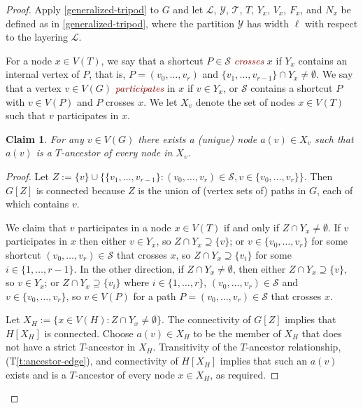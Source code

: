 \documentclass{patmorin}
\theoremstyle{plain}
\newtheorem{clm}{Claim}
\theoremstyle{definition}
\newcommand{\defin}[1]{\textcolor{Maroon}{\emph{#1}}}
\newcommand{\tref}[1]{(T\ref{t:#1})}
\renewcommand{\SS}{\mathcal{S}}
\begin{document}
\begin{proof}
Apply \cref{generalized-tripod} to $G$ and let $\mathcal{L}$, $\mathcal{Y}$, $\mathcal{T}$, $T$, $Y_x$, $V_x$, $F_x$, and $N_x$ be defined as in \cref{generalized-tripod}, where the partition $\mathcal{Y}$ has width $\ell$ with respect to the layering $\mathcal{L}$.

For a node $x\in V(T)$, we say that a shortcut $P\in\SS$ \defin{crosses} $x$ if $Y_x$ contains an internal vertex of $P$, that is, $P=(v_0,\ldots,v_r)$ and $\{v_1,\ldots,v_{r-1}\}\cap Y_x\neq\emptyset$.  We say that a vertex $v\in V(G)$ \defin{participates} in $x$ if $v\in Y_x$, or $\SS$ contains a shortcut $P$ with $v\in V(P)$ and $P$ crosses $x$. We let $X_v$ denote the set of nodes $x\in V(T)$ such that $v$ participates in $x$.

\begin{clm}\label{x-v-ancestor}
  For any $v\in V(G)$ there exists a (unique) node $a(v)\in X_v$ such that
  $a(v)$ is a $T$-ancestor of every node in $X_v$.
\end{clm}

\begin{proof}
  Let $Z := \{v\} \cup \{\{v_1,\ldots,v_{r-1}\}:(v_0,\ldots,v_r)\in\SS, v\in \{v_0,\ldots,v_r\}\}$. Then $G[Z]$ is connected because $Z$ is the union of (vertex sets of) paths in $G$, each of which contains $v$.

  We claim that $v$ participates in a node $x\in V(T)$ if and only if $Z\cap Y_x\neq\emptyset$.  If $v$ participates in $x$ then either $v\in Y_x$, so $Z\cap Y_x\supseteq\{v\}$; or $v\in \{v_0,\ldots,v_r\}$ for some shortcut $(v_0,\ldots,v_r)\in\SS$ that crosses $x$, so $Z\cap Y_x\supseteq \{v_i\}$ for some $i\in\{1,\ldots,r-1\}$.  In the other direction, if $Z\cap Y_x\neq\emptyset$, then either $Z\cap Y_x\supseteq \{v\}$, so $v\in Y_x$; or $Z\cap Y_x\supseteq \{v_i\}$ where $i\in\{1,\ldots,r\}$, $(v_0,\ldots,v_r)\in\SS$ and $v\in\{v_0,\ldots,v_r\}$, so $v\in V(P)$ for a path $P=(v_0,\ldots,v_r)\in\SS$ that crosses $x$.

  Let $X_H:=\{x\in V(H): Z\cap Y_x\neq\emptyset\}$.  The connectivity of $G[Z]$ implies that $H[X_H]$ is connected.
  Choose $a(v)\in X_H$ to be the member of $X_H$ that does not have a strict $T$-ancestor in $X_H$.  Transitivity of the $T$-ancestor relationship, \tref{ancestor-edge}, and connectivity of $H[X_H]$ implies that such an $a(v)$ exists and is a $T$-ancestor of every node $x\in X_H$, as required.
\end{proof}


\end{proof}
\end{document}
